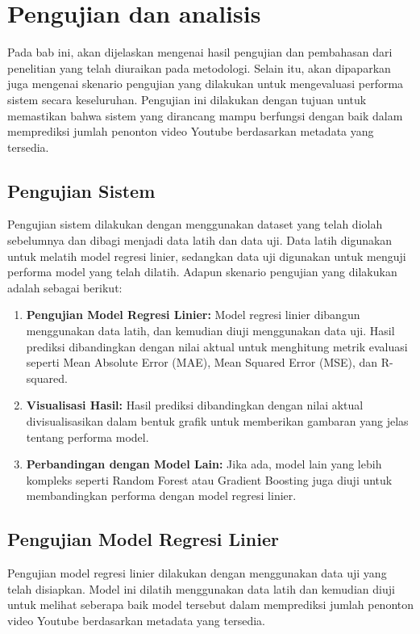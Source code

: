 \newpage
\section{Pengujian dan analisis}

Pada bab ini, akan dijelaskan mengenai hasil pengujian dan pembahasan dari penelitian yang telah diuraikan pada metodologi. Selain itu, akan dipaparkan juga mengenai skenario pengujian yang dilakukan untuk mengevaluasi performa sistem secara keseluruhan. Pengujian ini dilakukan dengan tujuan untuk memastikan bahwa sistem yang dirancang mampu berfungsi dengan baik dalam memprediksi jumlah penonton video Youtube berdasarkan metadata yang tersedia.

\subsection{Pengujian Sistem}
Pengujian sistem dilakukan dengan menggunakan dataset yang telah diolah sebelumnya dan dibagi menjadi data latih dan data uji. Data latih digunakan untuk melatih model regresi linier, sedangkan data uji digunakan untuk menguji performa model yang telah dilatih. Adapun skenario pengujian yang dilakukan adalah sebagai berikut:

\begin{enumerate}
    \item \textbf{Pengujian Model Regresi Linier:} Model regresi linier dibangun menggunakan data latih, dan kemudian diuji menggunakan data uji. Hasil prediksi dibandingkan dengan nilai aktual untuk menghitung metrik evaluasi seperti Mean Absolute Error (MAE), Mean Squared Error (MSE), dan R-squared.
    
    \item \textbf{Visualisasi Hasil:} Hasil prediksi dibandingkan dengan nilai aktual divisualisasikan dalam bentuk grafik untuk memberikan gambaran yang jelas tentang performa model.
    
    \item \textbf{Perbandingan dengan Model Lain:} Jika ada, model lain yang lebih kompleks seperti Random Forest atau Gradient Boosting juga diuji untuk membandingkan performa dengan model regresi linier.
\end{enumerate}

\subsection{Pengujian Model Regresi Linier}
Pengujian model regresi linier dilakukan dengan menggunakan data uji yang telah disiapkan. Model ini dilatih menggunakan data latih dan kemudian diuji untuk melihat seberapa baik model tersebut dalam memprediksi jumlah penonton video Youtube berdasarkan metadata yang tersedia.

